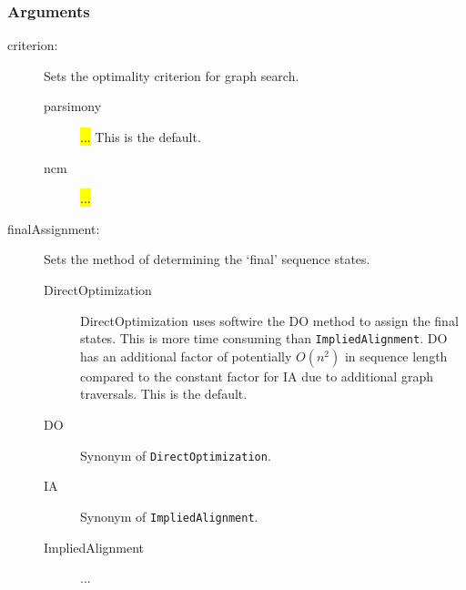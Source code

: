 	\subsubsection{Arguments}
		\begin{description}
			
		\item[criterion:] Sets the optimality criterion for graph search.
			
			\begin{description}
			\item[parsimony]  \hl{...} This is the default.
			
			\item[ncm]  \hl{...}
			\end{description}
			
		\item[finalAssignment:] Sets the method of determining the `final' sequence states. 
						
			\begin{description}
			\item[DirectOptimization] DirectOptimization uses softwire the DO 
			method to assign the final states. This is more time consuming than \texttt{ImpliedAlignment}. 
			DO has an additional factor of potentially $O(n^2)$ in sequence length compared 
			to the constant factor for IA due to additional graph traversals. This is the default.

			\item[DO] Synonym of \texttt{DirectOptimization}.
			
			\item[IA] Synonym of \texttt{ImpliedAlignment}.
			
			\item[ImpliedAlignment] ...
			\end{description}
			

\end{description}
